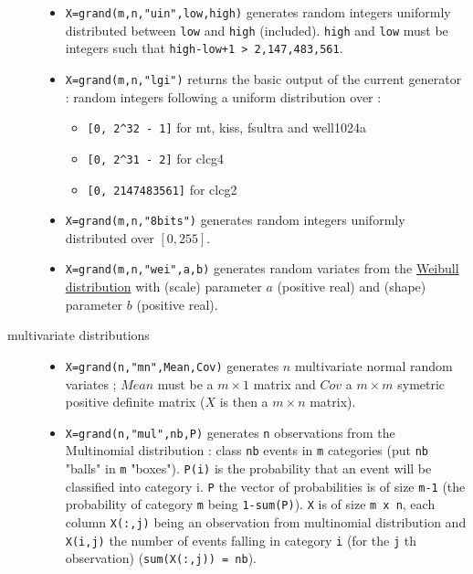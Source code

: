 \begin{description}
\begin{itemize}
\item {} \verb!X=grand(m,n,"uin",low,high)! generates random integers uniformly 
      distributed between \verb!low! and \verb!high! (included). \verb!high!
      and \verb!low! must be integers such that \verb!high-low+1 > 2,147,483,561!.

\item {} \verb!X=grand(m,n,"lgi")! returns the basic output of the current generator : random integers  
      following a uniform distribution over : 
      \begin{itemize}
      \item \verb![0, 2^32 - 1]! for mt, kiss, fsultra and well1024a
      \item \verb![0, 2^31 - 2]! for clcg4
      \item \verb![0, 2147483561]! for clcg2
      \end{itemize}

\item {} \verb!X=grand(m,n,"8bits")! generates random integers uniformly 
      distributed over $[0,255]$.
  
\item {} 
  \verb!X=grand(m,n,"wei",a,b)! generates random variates from the  \hyperlink{weipdf}{Weibull 
  distribution} with (scale) parameter $a$ (positive real) and (shape) parameter $b$ (positive real).
\end{itemize}

\item[multivariate distributions]
\begin{itemize}
\item {}
  \verb!X=grand(n,"mn",Mean,Cov)! generates  $n$ multivariate normal random variates ; 
  $Mean$ must be a $m \times 1$ matrix and $Cov$ a  $m \times m$ 
  symetric positive definite matrix  ($X$ is then a  $m \times n$
  matrix).

\item {} 
   \verb!X=grand(n,"mul",nb,P)! generates \verb!n! observations from the Multinomial 
  distribution :  class \verb!nb! events in \verb!m! categories (put \verb!nb!
  "balls" in \verb!m! "boxes"). \verb!P(i)! is the probability 
  that an event will be classified into category i. \verb!P! the vector of probabilities
  is of size  \verb!m-1! (the probability of category \verb!m! being \verb!1-sum(P)!).
  \verb!X! is of size \verb!m x n!, each column \verb!X(:,j)! being an observation 
  from multinomial distribution and \verb!X(i,j)! the number of events falling in category 
  \verb!i! (for the \verb!j! th observation) (\verb!sum(X(:,j)) = nb!).
  

\end{itemize}
\end{description}
